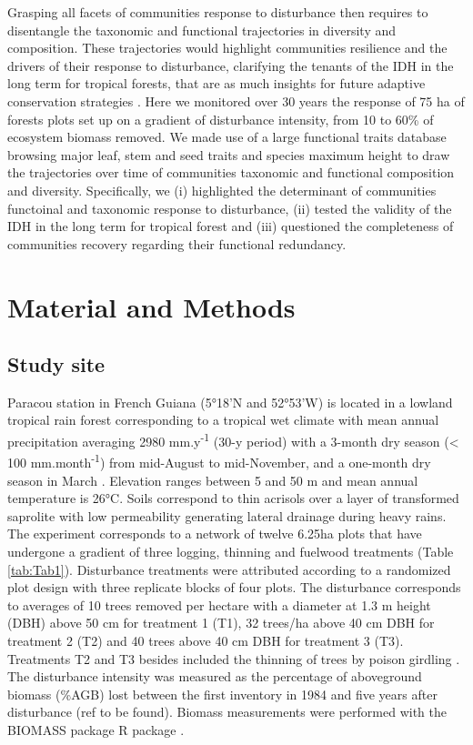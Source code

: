 \documentclass[fleqn,10pt]{ArtEcoFoG} %
\theoremstyle{definition}
\theoremstyle{definition}
\theoremstyle{definition}
\theoremstyle{remark}
\begin{document}
Grasping all facets of communities response to disturbance then requires
to disentangle the taxonomic and functional trajectories in diversity
and composition. These trajectories would highlight communities
resilience and the drivers of their response to disturbance, clarifying
the tenants of the IDH in the long term for tropical forests, that are
as much insights for future adaptive conservation strategies
\citep{Adler2007}. Here we monitored over 30 years the response of 75 ha
of forests plots set up on a gradient of disturbance intensity, from 10
to 60\% of ecosystem biomass removed. We made use of a large functional
traits database browsing major leaf, stem and seed traits and species
maximum height to draw the trajectories over time of communities
taxonomic and functional composition and diversity. Specifically, we (i)
highlighted the determinant of communities functoinal and taxonomic
response to disturbance, (ii) tested the validity of the IDH in the long
term for tropical forest and (iii) questioned the completeness of
communities recovery regarding their functional redundancy.

\section{Material and Methods}\label{material-and-methods}

\subsection{Study site}\label{study-site}

Paracou station in French Guiana (5°18'N and 52°53'W) is located in a
lowland tropical rain forest corresponding to a tropical wet climate
with mean annual precipitation averaging 2980 mm.y\textsuperscript{-1}
(30-y period) with a 3-month dry season (\textless{} 100
mm.month\textsuperscript{-1}) from mid-August to mid-November, and a
one-month dry season in March \citep{Wagner2011}. Elevation ranges
between 5 and 50 m and mean annual temperature is 26°C. Soils correspond
to thin acrisols over a layer of transformed saprolite with low
permeability generating lateral drainage during heavy rains. The
experiment corresponds to a network of twelve 6.25ha plots that have
undergone a gradient of three logging, thinning and fuelwood treatments
(Table \ref{tab:Tab1}). Disturbance treatments were attributed according
to a randomized plot design with three replicate blocks of four plots.
The disturbance corresponds to averages of 10 trees removed per hectare
with a diameter at 1.3 m height (DBH) above 50 cm for treatment 1 (T1),
32 trees/ha above 40 cm DBH for treatment 2 (T2) and 40 trees above 40
cm DBH for treatment 3 (T3). Treatments T2 and T3 besides included the
thinning of trees by poison girdling \citep{Blanc2009}. The disturbance
intensity was measured as the percentage of aboveground biomass (\%AGB)
lost between the first inventory in 1984 and five years after
disturbance (ref to be found). Biomass measurements were performed with
the BIOMASS package R package \citep{Biomass2018}.
\end{document}
